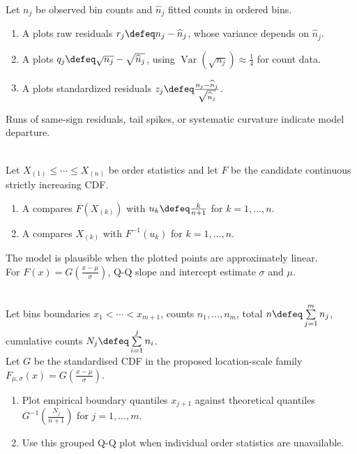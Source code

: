\begin{definition} \label{def:hanging-rootogram-and-chigram} \\
Let $n_j$ be observed bin counts and $\widehat n_j$ fitted counts in ordered bins.
\begin{enumerate}[label=(\roman*)]
\setlength{\itemsep}{0pt}
\item A  plots raw residuals $r_j\defeq n_j-\widehat n_j$, whose variance depends on $\widehat n_j$.
\item A  plots $q_j\defeq\sqrt{n_j}-\sqrt{\widehat n_j}$, using $\operatorname{Var}(\sqrt{n_j})\approx\frac{1}{4}$ for count data.
\item A  plots standardized residuals $z_j\defeq\frac{n_j-\widehat n_j}{\sqrt{\widehat n_j}}$.
\end{enumerate}
Runs of same-sign residuals, tail spikes, or systematic curvature indicate model departure.
\end{definition}

\begin{method} \label{meth:probability-plot-construction} \\
Let $X_{(1)}\leq\cdots\leq X_{(n)}$ be order statistics and let $F$ be the candidate continuous strictly increasing CDF.
\begin{enumerate}[label=(\roman*)]
\setlength{\itemsep}{0pt}
\item A  compares $F(X_{(k)})$ with $u_k\defeq \frac{k}{n+1}$ for $k=1,\ldots,n$.
\item A  compares $X_{(k)}$ with $F^{-1}(u_k)$ for $k=1,\ldots,n$.
\end{enumerate}
The model is plausible when the plotted points are approximately linear.\\
For $F(x)=G(\frac{x-\mu}{\sigma})$, Q-Q slope and intercept estimate $\sigma$ and $\mu$.
\end{method}

\begin{method} \label{meth:probability-plots-for-grouped-data} \\
Let bins boundaries $x_1<\cdots<x_{m+1}$, counts $n_1,\ldots,n_m$, total $n\defeq\sum\limits_{j=1}^mn_j$, cumulative counts $N_j\defeq\sum\limits_{i=1}^jn_i$.\\
Let $G$ be the standardised CDF in the proposed location-scale family $F_{\mu,\sigma}(x)=G(\frac{x-\mu}{\sigma})$.
\begin{enumerate}[label=(\roman*)]
\setlength{\itemsep}{0pt}
\item Plot empirical boundary quantiles $x_{j+1}$ against theoretical quantiles $G^{-1}(\frac{N_j}{n+1})$ for $j=1,\ldots,m$.
\item Use this grouped Q-Q plot when individual order statistics are unavailable.
\end{enumerate}
\end{method}

